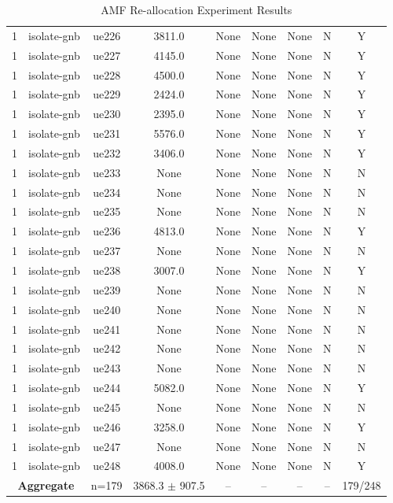 \begin{table}[ht]
\begin{tabular}{|c|c|c|c|c|c|c|c|c|}
1 & isolate-gnb & ue226 & 3811.0 & None & None & None & N & Y \\
1 & isolate-gnb & ue227 & 4145.0 & None & None & None & N & Y \\
1 & isolate-gnb & ue228 & 4500.0 & None & None & None & N & Y \\
1 & isolate-gnb & ue229 & 2424.0 & None & None & None & N & Y \\
1 & isolate-gnb & ue230 & 2395.0 & None & None & None & N & Y \\
1 & isolate-gnb & ue231 & 5576.0 & None & None & None & N & Y \\
1 & isolate-gnb & ue232 & 3406.0 & None & None & None & N & Y \\
1 & isolate-gnb & ue233 & None & None & None & None & N & N \\
1 & isolate-gnb & ue234 & None & None & None & None & N & N \\
1 & isolate-gnb & ue235 & None & None & None & None & N & N \\
1 & isolate-gnb & ue236 & 4813.0 & None & None & None & N & Y \\
1 & isolate-gnb & ue237 & None & None & None & None & N & N \\
1 & isolate-gnb & ue238 & 3007.0 & None & None & None & N & Y \\
1 & isolate-gnb & ue239 & None & None & None & None & N & N \\
1 & isolate-gnb & ue240 & None & None & None & None & N & N \\
1 & isolate-gnb & ue241 & None & None & None & None & N & N \\
1 & isolate-gnb & ue242 & None & None & None & None & N & N \\
1 & isolate-gnb & ue243 & None & None & None & None & N & N \\
1 & isolate-gnb & ue244 & 5082.0 & None & None & None & N & Y \\
1 & isolate-gnb & ue245 & None & None & None & None & N & N \\
1 & isolate-gnb & ue246 & 3258.0 & None & None & None & N & Y \\
1 & isolate-gnb & ue247 & None & None & None & None & N & N \\
1 & isolate-gnb & ue248 & 4008.0 & None & None & None & N & Y \\
\multicolumn{2}{|c|}{\textbf{Aggregate}} & n=179 & 3868.3 $\pm$ 907.5 & -- & -- & -- & -- & 179/248 \\
\hline
\end{tabular}
\caption{AMF Re-allocation Experiment Results}
\label{tab:amf_realloc}
\end{table}
